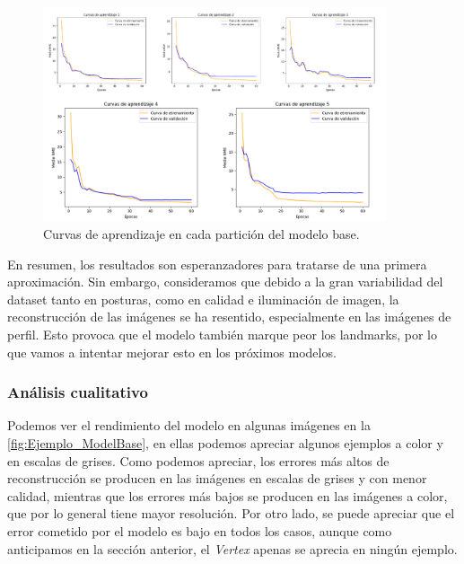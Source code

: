         \begin{figure}[H]
            \centering
            \includegraphics[width=0.9\textwidth]{img/curvas_aprendizaje_modelbase.png}
            \caption{Curvas de aprendizaje en cada partición del modelo base.}
            \label{fig:Curvas_modelbase}
        \end{figure}

        \noindent En resumen, los resultados son esperanzadores para tratarse de una primera aproximación. Sin embargo, consideramos que debido a la gran variabilidad del dataset tanto en posturas, como en calidad e iluminación de imagen, la reconstrucción de las imágenes se ha resentido, especialmente en las imágenes de perfil. Esto provoca que el modelo también marque peor los landmarks, por lo que vamos a intentar mejorar esto en los próximos modelos. 
        
        
        \subsubsection*{Análisis cualitativo}
        
        \medskip Podemos ver el rendimiento del modelo en algunas imágenes en la \autoref{fig:Ejemplo_ModelBase}, en ellas podemos apreciar algunos ejemplos a color y en escalas de grises. Como podemos apreciar, los errores más altos de reconstrucción se producen en las imágenes en escalas de grises y con menor calidad, mientras que los errores más bajos se producen en las imágenes a color, que por lo general tiene mayor resolución. Por otro lado, se puede apreciar que el error cometido por el modelo es bajo en todos los casos, aunque como anticipamos en la sección anterior, el \textit{Vertex} apenas se aprecia en ningún ejemplo.

